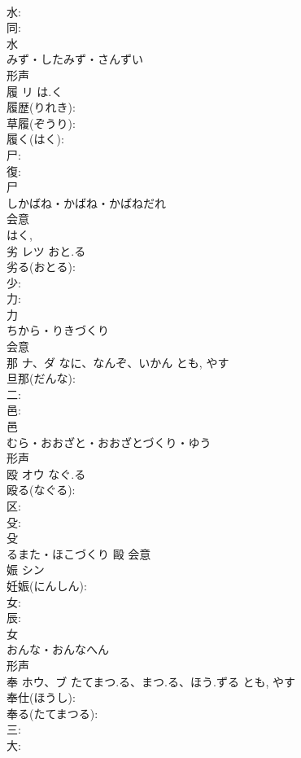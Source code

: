 \documentclass[8pt]{extreport}
\begin{document}
\begin{CJK}{UTF8}{min}
\\	水: 
\\	同: 
\\	水	
\\	みず・したみず・さんずい	
\\	形声 
\\	履	リ	は.く		
\\	履歴(りれき): 
\\	草履(ぞうり): 
\\	履く(はく): 
\\	尸: 
\\	復: 
\\	尸	
\\	しかばね・かばね・かばねだれ	
\\	会意 
\\	はく, 
\\	劣	レツ	おと.る		
\\	劣る(おとる): 
\\	少: 
\\	力: 
\\	力	
\\	ちから・りきづくり	
\\	会意 
\\	那	ナ、ダ	なに、なんぞ、いかん	とも, やす	
\\	旦那(だんな): 
\\	二: 
\\	邑: 
\\	邑	
\\	むら・おおざと・おおざとづくり・ゆう	
\\	形声 
\\	殴	オウ	なぐ.る		
\\	殴る(なぐる): 
\\	区: 
\\	殳: 
\\	殳	
\\	るまた・ほこづくり	毆	会意 
\\	娠	シン			
\\	妊娠(にんしん): 
\\	女: 
\\	辰: 
\\	女	
\\	おんな・おんなへん	
\\	形声 
\\	奉	ホウ、ブ	たてまつ.る、まつ.る、ほう.ずる	とも, やす	
\\	奉仕(ほうし): 
\\	奉る(たてまつる): 
\\	三: 
\\	大: 

\end{CJK}
\end{document}
